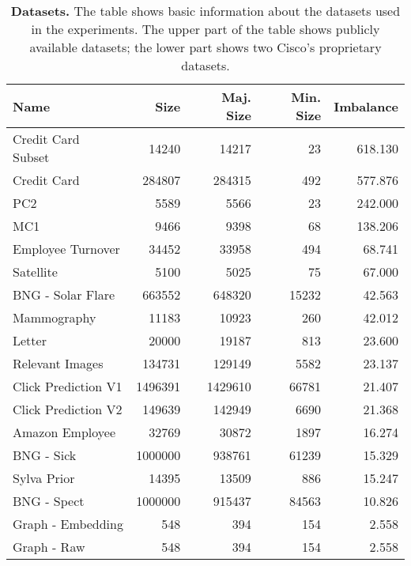 \begin{table}[ht]
    \centering

    \begin{tabular}{lrrrr}
        \toprule
        Name & Size & Maj. Size & Min. Size & Imbalance \\
        \midrule
        Credit Card Subset~\cite{credit-card} & 14240 & 14217 & 23 & 618.130 \\
        Credit Card~\cite{credit-card} & 284807 & 284315 & 492 & 577.876 \\
        PC2~\cite{pc2+mc1} & 5589 & 5566 & 23 & 242.000 \\
        MC1~\cite{pc2+mc1} & 9466 & 9398 & 68 & 138.206 \\
        Employee Turnover & 34452 & 33958 & 494 & 68.741 \\
        Satellite~\cite{satellite} & 5100 & 5025 & 75 & 67.000 \\
        BNG - Solar Flare & 663552 & 648320 & 15232 & 42.563 \\
        Mammography & 11183 & 10923 & 260 & 42.012 \\
        Letter & 20000 & 19187 & 813 & 23.600 \\
        Relevant Images & 134731 & 129149 & 5582 & 23.137 \\
        Click Prediction V1 & 1496391 & 1429610 & 66781 & 21.407 \\
        Click Prediction V2 & 149639 & 142949 & 6690 & 21.368 \\
        Amazon Employee & 32769 & 30872 & 1897 & 16.274 \\
        BNG - Sick & 1000000 & 938761 & 61239 & 15.329 \\
        Sylva Prior & 14395 & 13509 & 886 & 15.247 \\
        BNG - Spect & 1000000 & 915437 & 84563 & 10.826 \\
        \midrule
        Graph - Embedding & 548 & 394 & 154 & 2.558 \\
        Graph - Raw & 548 & 394 & 154 & 2.558 \\
        \bottomrule
    \end{tabular}

    \caption{
        \textbf{Datasets.} The table shows basic information about the datasets used in the
        experiments. The upper part of the table shows publicly available datasets; the lower part
        shows two Cisco's proprietary datasets.
    }
    \label{table:datasets}
\end{table}
